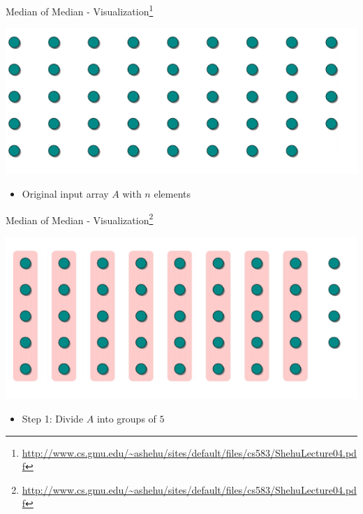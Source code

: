 \documentclass{beamer}
\begin{document}
\begin{frame}{Median of Median - Visualization\footnote{\url{http://www.cs.gmu.edu/~ashehu/sites/default/files/cs583/ShehuLecture04.pdf}}}
\begin{center}
    \includegraphics[scale=0.4]{medianOfMedian1.png}
\end{center}
\begin{itemize}
    \item Original input array $A$ with $n$ elements 
\end{itemize}
\end{frame}


\begin{frame}{Median of Median - Visualization\footnote{\url{http://www.cs.gmu.edu/~ashehu/sites/default/files/cs583/ShehuLecture04.pdf}}}
\begin{center}
    \includegraphics[scale=0.4]{medianOfMedian2.png}
\end{center}
\begin{itemize}
    \item Step 1: Divide $A$ into groups of $5$ 
\end{itemize}
\end{frame}
\end{document}
